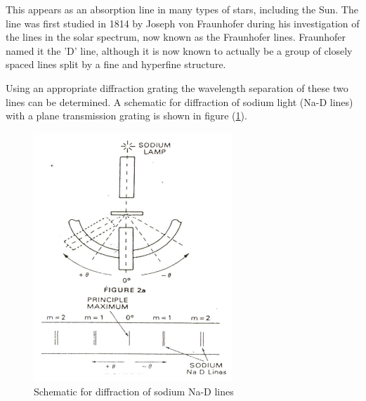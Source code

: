 \documentclass{article}
\begin{document}
This appears as an absorption line in many types of stars, including the Sun. The line was first studied in 1814 by Joseph von Fraunhofer during his investigation of the lines in the solar spectrum, now known as the Fraunhofer lines. Fraunhofer named it the 'D' line, although it is now known to actually be a group of closely spaced lines split by a fine and hyperfine structure.
\par
\noindent
Using an appropriate diffraction grating the wavelength separation of these two lines can be determined. A schematic for diffraction of sodium light (Na-D lines) with a plane transmission grating is shown in figure (\ref{fig:schematic}).
\begin{figure}[]
    \centering
    \includegraphics{Figures/schematic.png}
    \caption{Schematic for diffraction of sodium Na-D lines}
    \label{fig:schematic}
\end{figure}
\clearpage
\end{document}
